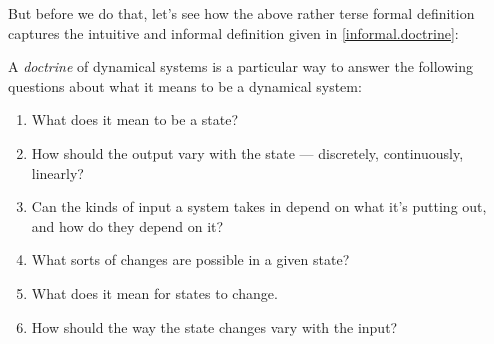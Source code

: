 \documentclass[DynamicalBook]{subfiles}
\begin{document}
But before we do that, let's see how the above
rather terse formal definition captures the intuitive and informal definition
given in \cref{informal.doctrine}:
\begin{informal}
  A \emph{doctrine} of dynamical systems is a particular way to answer the following
  questions about what it means to be a dynamical system:
  \begin{enumerate}
  \item What does it mean to be a state?
  \item How should the output vary with the state --- discretely,
    continuously, linearly?
  \item Can the kinds of input a
    system takes in depend on what it's putting out, and how do they depend on it?
  \item What sorts of changes are possible in a given state?
  \item What does it mean for states to change. 
  \item How should the way the state changes vary with the input?
  \end{enumerate}
\end{informal}
\end{document}
